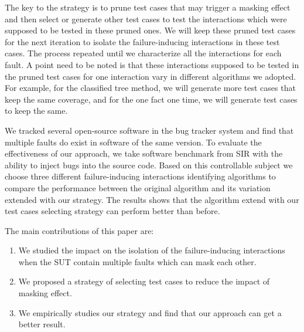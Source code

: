 \documentclass{sig-alternate}
\begin{document}

The key to the strategy is to prune test cases that may trigger a masking effect and then select or generate other test cases to test the interactions which were supposed to be tested in these pruned ones. We will keep these pruned test cases for the next iteration to isolate the failure-inducing interactions in these test cases. The process repeated until we characterize all the interactions for each fault. A point need to be noted is that these interactions supposed to be tested in the pruned test cases for one interaction vary in different algorithms we adopted. For example, for the classified tree method, we will generate more test cases that keep the same coverage, and for the one fact one time, we will generate test cases to keep the same.

We tracked several open-source software in the bug tracker system and find that multiple faults do exist in software of the same version. To evaluate the effectiveness of our approach, we take software benchmark from SIR with the ability to inject bugs into the source code. Based on this controllable subject we choose three different failure-inducing interactions identifying algorithms to compare the performance between the original algorithm and its variation extended with our strategy. The results shows that the algorithm extend with our test cases selecting strategy can perform better than before.

The main contributions of this paper are:
\begin{enumerate}
 \item We studied the impact on the isolation of the failure-inducing interactions when the SUT contain multiple faults which can mask each other.
 \item We proposed a strategy of selecting test cases to reduce the impact of masking effect.
 \item We empirically studies our strategy and find that our approach can get a better result.

\end{enumerate}



\end{document}
